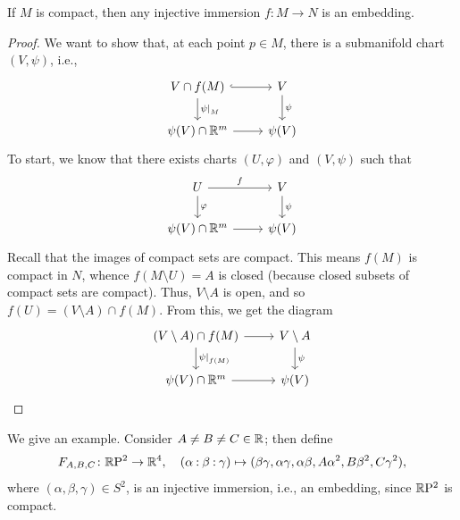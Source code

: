 \begin{theorem}
    If $M$ is compact, then any injective immersion $f \colon M \to N$ is an embedding.
\end{theorem}
\begin{proof}
    We want to show that, at each point $p \in M$, there is a submanifold chart $(V, \psi)$, i.e., 
    \[ \begin{tikzcd} V \cap f(M) \arrow[r, hook] \arrow[d, "\restr{\psi}{M}"] & V \arrow[d, "\psi"] \\ \psi(V) \cap \RR^m \arrow[r] & \psi(V) \end{tikzcd} \]
    To start, we know that there exists charts $(U, \varphi)$ and $(V, \psi)$ such that
    \[ \begin{tikzcd} U \arrow[r, "f"] \arrow[d, "\varphi"] & V \arrow[d, "\psi"] \\ \psi(V) \cap \RR^m \arrow[r] & \psi(V) \end{tikzcd} \]
    Recall that the images of compact sets are compact. This means $f(M)$ is compact in $N$, whence $f(M \setminus U) = A$ is closed (because closed subsets of compact sets are compact). Thus, $V \setminus A$ is open, and so $f(U) = (V \setminus A) \cap f(M)$. From this, we get the diagram
    \[ \begin{tikzcd} (V \setminus A) \cap f(M) \arrow[r] \arrow[d, "\restr{\psi}{f(M)}"] & V \setminus A \arrow[d, "\psi"] \\ \psi(V) \cap \RR^m \arrow[r] & \psi(V) \end{tikzcd} \qedhere \]
\end{proof}
We give an example. Consider $A \neq B \neq C \in \mathbb R$; then define
\[ F_{A,B,C} \colon \RP^2 \to \RR^4, \quad \pcoor{\alpha : \beta : \gamma} \mapsto (\beta \gamma, \alpha \gamma, \alpha \beta, A\alpha^2, B\beta^2, C\gamma^2), \]
where $(\alpha, \beta, \gamma) \in S^2$, is an injective immersion, i.e., an embedding, since $\mathbb{R}\mathrm{P}^2$ is compact.